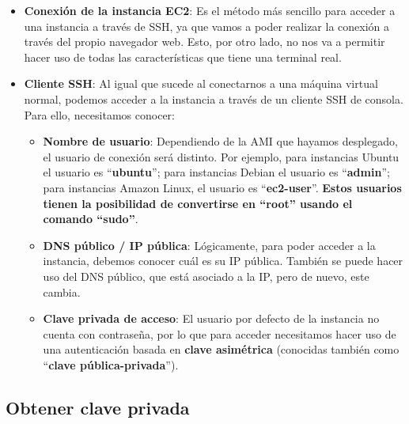 \begin{itemize}
	\item \textbf{Conexión de la instancia EC2}: Es el método más sencillo para acceder a una instancia a través de SSH, ya que vamos a poder realizar la conexión a través del propio navegador web. Esto, por otro lado, no nos va a permitir hacer uso de todas las características que tiene una terminal real.
	
	\item \textbf{Cliente SSH}: Al igual que sucede al conectarnos a una máquina virtual normal,  podemos acceder a la instancia a través de un cliente SSH de consola. Para ello, necesitamos conocer:
	\begin{itemize}
		\item \textbf{Nombre de usuario}: Dependiendo de la AMI que hayamos desplegado, el usuario de conexión será distinto. Por ejemplo, para instancias Ubuntu el usuario es “\textbf{ubuntu}”; para instancias Debian el usuario es “\textbf{admin}”; para instancias Amazon Linux, el usuario es “\textbf{ec2-user}”. \textbf{Estos usuarios tienen la posibilidad de convertirse en “root” usando el comando “sudo”}.


		\item \textbf{DNS público / IP pública}: Lógicamente, para poder acceder a la instancia, debemos conocer cuál es su IP pública. También se puede hacer uso del DNS público, que está asociado a la IP, pero de nuevo, este cambia.
		
		
		\item \textbf{Clave privada de acceso}: El usuario por defecto de la instancia no cuenta con contraseña, por lo que para acceder necesitamos hacer uso de una autenticación basada en \textbf{clave asimétrica} (conocidas también como “\textbf{clave pública-privada}”).
		
		
	\end{itemize}
\end{itemize}


\subsection{Obtener clave privada}

